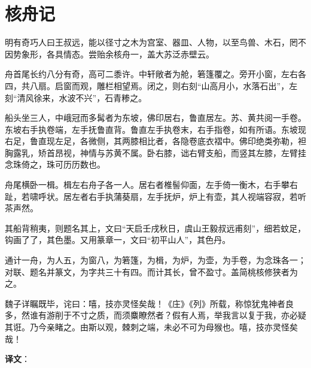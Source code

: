 \documentclass[12pt,UTF-8,openany]{ctexbook}
\begin{document}
\chapter{核舟记}

\begin{normalsize}
    
    明有奇巧人曰王叔远，能以径寸之木为宫室、器皿、人物，以至鸟兽、木石，罔不因势象形，各具情态。尝贻余核舟一，盖大苏泛赤壁云。
    
    舟首尾长约八分有奇，高可二黍许。中轩敞者为舱，箬篷覆之。旁开小窗，左右各四，共八扇。启窗而观，雕栏相望焉。闭之，则右刻“山高月小，水落石出”，左刻“清风徐来，水波不兴”，石青糁之。
    
    船头坐三人，中峨冠而多髯者为东坡，佛印居右，鲁直居左。苏、黄共阅一手卷。东坡右手执卷端，左手抚鲁直背。鲁直左手执卷末，右手指卷，如有所语。东坡现右足，鲁直现左足，各微侧，其两膝相比者，各隐卷底衣褶中。佛印绝类弥勒，袒胸露乳，矫首昂视，神情与苏黄不属。卧右膝，诎右臂支船，而竖其左膝，左臂挂念珠倚之，珠可历历数也。
    
    舟尾横卧一楫。楫左右舟子各一人。居右者椎髻仰面，左手倚一衡木，右手攀右趾，若啸呼状。居左者右手执蒲葵扇，左手抚炉，炉上有壶，其人视端容寂，若听茶声然。
    
    其船背稍夷，则题名其上，文曰“天启壬戌秋日，虞山王毅叔远甫刻”，细若蚊足，钩画了了，其色墨。又用篆章一，文曰“初平山人”，其色丹。
    
    通计一舟，为人五，为窗八，为箬篷，为楫，为炉，为壶，为手卷，为念珠各一；对联、题名并篆文，为字共三十有四。而计其长，曾不盈寸。盖简桃核修狭者为之。
    
    魏子详瞩既毕，诧曰：嘻，技亦灵怪矣哉！《庄》《列》所载，称惊犹鬼神者良多，然谁有游削于不寸之质，而须麋瞭然者？假有人焉，举我言以复于我，亦必疑其诳。乃今亲睹之。由斯以观，棘刺之端，未必不可为母猴也。嘻，技亦灵怪矣哉！
\end{normalsize}


\newpage

\textbf{译文}：

\vspace{1em}
\end{document}

